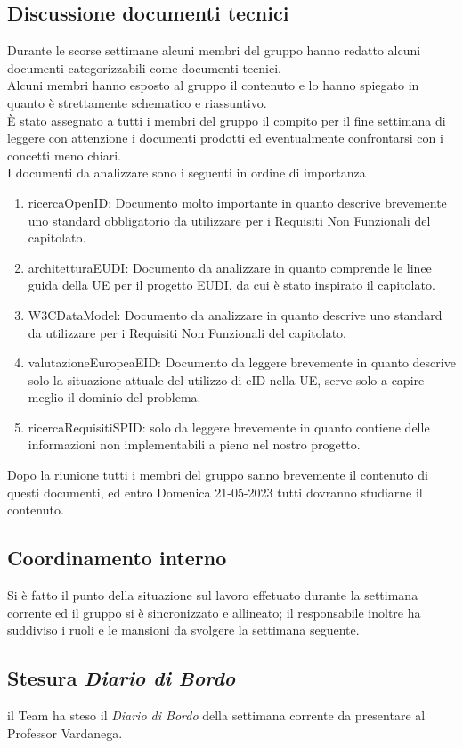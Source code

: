 \subsection{Discussione documenti tecnici}
Durante le scorse settimane alcuni membri del gruppo hanno redatto alcuni documenti categorizzabili come documenti tecnici.\\
Alcuni membri hanno esposto al gruppo il contenuto e lo hanno spiegato in quanto è strettamente schematico e riassuntivo.\\
È stato assegnato a tutti i membri del gruppo il compito per il fine settimana di leggere con attenzione i documenti prodotti ed eventualmente confrontarsi con i concetti meno chiari.\\
I documenti da analizzare sono i seguenti in ordine di importanza
\begin{enumerate}
\item ricercaOpenID: Documento molto importante in quanto descrive brevemente uno standard obbligatorio da utilizzare per i Requisiti Non Funzionali del capitolato.
\item architetturaEUDI: Documento da analizzare in quanto comprende le linee guida della UE per il progetto EUDI, da cui è stato inspirato il capitolato.
\item W3CDataModel: Documento da analizzare in quanto descrive uno standard da utilizzare per i Requisiti Non Funzionali del capitolato.
\item valutazioneEuropeaEID: Documento da leggere brevemente in quanto descrive solo la situazione attuale del utilizzo di eID nella UE, serve solo a capire meglio il dominio del problema.
\item ricercaRequisitiSPID: solo da leggere brevemente in quanto contiene delle informazioni non implementabili a pieno nel nostro progetto.
\end{enumerate}
Dopo la riunione tutti i membri del gruppo sanno brevemente il contenuto di questi documenti, ed entro Domenica 21-05-2023 tutti dovranno studiarne il contenuto.

\subsection{Coordinamento interno}
Si è fatto il punto della situazione sul lavoro effetuato durante la settimana corrente ed il gruppo si è sincronizzato e allineato; il responsabile inoltre ha suddiviso i ruoli e le mansioni da svolgere la settimana seguente. 

\subsection{Stesura \textit{Diario di Bordo}}
il Team ha steso il \textit{Diario di Bordo} della settimana corrente da presentare al Professor Vardanega.